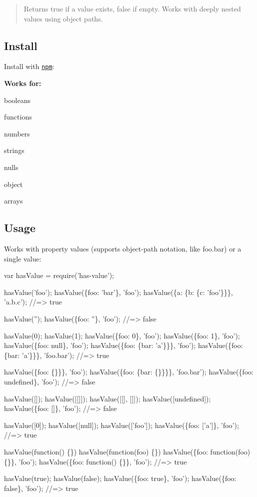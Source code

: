 \begin{quote}
Returns true if a value exists, false if empty. Works with deeply nested values using object paths. \end{quote}


\subsection*{Install}

Install with \href{https://www.npmjs.com/}{\tt npm}\+:




{\bfseries Works for\+:}


\begin{DoxyItemize}
\item booleans
\item functions
\item numbers
\item strings
\item nulls
\item object
\item arrays
\end{DoxyItemize}

\subsection*{Usage}

Works with property values (supports object-\/path notation, like {\ttfamily foo.\+bar}) or a single value\+:


\begin{DoxyCode}
var hasValue = require('has-value');

hasValue('foo');
hasValue(\{foo: 'bar'\}, 'foo');
hasValue(\{a: \{b: \{c: 'foo'\}\}\}, 'a.b.c');
//=> true

hasValue('');
hasValue(\{foo: ''\}, 'foo');
//=> false

hasValue(0);
hasValue(1);
hasValue(\{foo: 0\}, 'foo');
hasValue(\{foo: 1\}, 'foo');
hasValue(\{foo: null\}, 'foo');
hasValue(\{foo: \{bar: 'a'\}\}\}, 'foo');
hasValue(\{foo: \{bar: 'a'\}\}\}, 'foo.bar');
//=> true

hasValue(\{foo: \{\}\}\}, 'foo');
hasValue(\{foo: \{bar: \{\}\}\}\}, 'foo.bar');
hasValue(\{foo: undefined\}, 'foo');
//=> false

hasValue([]);
hasValue([[]]);
hasValue([[], []]);
hasValue([undefined]);
hasValue(\{foo: []\}, 'foo');
//=> false

hasValue([0]);
hasValue([null]);
hasValue(['foo']);
hasValue(\{foo: ['a']\}, 'foo');
//=> true

hasValue(function() \{\})
hasValue(function(foo) \{\})
hasValue(\{foo: function(foo) \{\}\}, 'foo'); 
hasValue(\{foo: function() \{\}\}, 'foo');
//=> true

hasValue(true);
hasValue(false);
hasValue(\{foo: true\}, 'foo');
hasValue(\{foo: false\}, 'foo');
//=> true
\end{DoxyCode}


